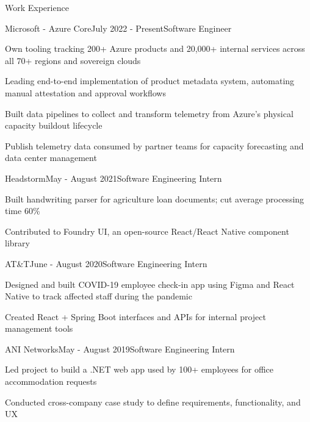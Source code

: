\documentclass{resume} %
\begin{document}

\begin{rSection}{Work Experience}
    \begin{rSubsection}{Microsoft - Azure Core}{July 2022 - Present}{Software Engineer}{}
        \item Own tooling tracking 200+ Azure products and 20,000+ internal services across all 70+ regions and sovereign clouds
        \item Leading end-to-end implementation of product metadata system, automating manual attestation and approval workflows
        \item Built data pipelines to collect and transform telemetry from Azure's physical capacity buildout lifecycle
        \item Publish telemetry data consumed by partner teams for capacity forecasting and data center management
    \end{rSubsection}

    \begin{rSubsection}{Headstorm}{May - August 2021}{Software Engineering Intern}{}
        \item Built handwriting parser for agriculture loan documents; cut average processing time 60\%
        \item Contributed to Foundry UI, an open-source React/React Native component library
    \end{rSubsection}

    \begin{rSubsection}{AT\&T}{June - August 2020}{Software Engineering Intern}{}
        \item Designed and built COVID-19 employee check-in app using Figma and React Native to track affected staff during the pandemic
        \item Created React + Spring Boot interfaces and APIs for internal project management tools
    \end{rSubsection}

    \begin{rSubsection}{ANI Networks}{May - August 2019}{Software Engineering Intern}{}
        \item Led project to build a .NET web app used by 100+ employees for office accommodation requests
        \item Conducted cross-company case study to define requirements, functionality, and UX
    \end{rSubsection}
\end{rSection}
\end{document}
